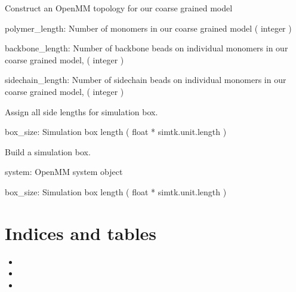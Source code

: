 \documentclass[letterpaper,10pt,english]{sphinxmanual}
\begin{document}

\begin{fulllineitems}
\label{\detokenize{openmm:openmm.build_mm_topology}}
Construct an OpenMM topology for our coarse grained model

polymer\_length: Number of monomers in our coarse grained model
( integer )

backbone\_length: Number of backbone beads on individual monomers
in our coarse grained model, ( integer )

sidechain\_length: Number of sidechain beads on individual monomers
in our coarse grained model, ( integer )

\end{fulllineitems}


\begin{fulllineitems}
\label{\detokenize{openmm:openmm.get_box_vectors}}
Assign all side lengths for simulation box.

box\_size: Simulation box length ( float * simtk.unit.length )

\end{fulllineitems}


\begin{fulllineitems}
\label{\detokenize{openmm:openmm.set_box_vectors}}
Build a simulation box.

system: OpenMM system object

box\_size: Simulation box length ( float * simtk.unit.length )

\end{fulllineitems}



\chapter{Indices and tables}
\label{\detokenize{index:indices-and-tables}}\begin{itemize}
\item {} 

\item {} 

\item {} 

\end{itemize}
\end{document}
